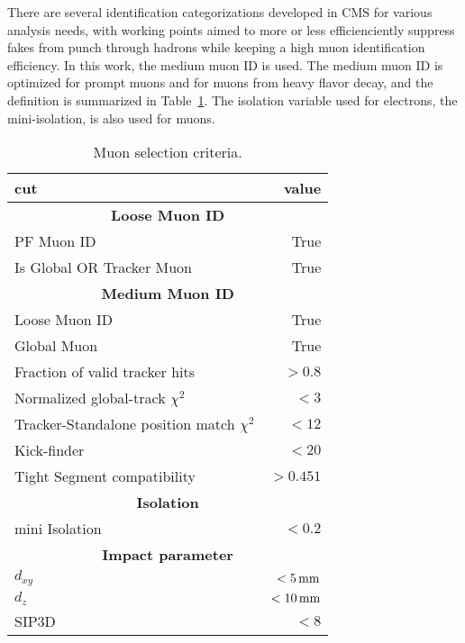There are several identification categorizations developed in CMS for various analysis needs, with working points aimed to more or less efficienciently suppress fakes from punch through hadrons while keeping a high muon identification efficiency.
In this work, the medium muon ID is used. The medium muon ID is optimized for prompt muons and for muons from heavy flavor decay, and the definition is summarized in Table~\ref{tab:muonsID}. 
The isolation variable used for electrons, the mini-isolation, is also used for muons. 

\begin{table}[ht!]
\def\arraystretch{1.2}
    \caption{Muon selection criteria.}
    \label{tab:muonsID}
    \begin{center}
        \begin{tabular}{ l r}
        \hline \hline
        cut         &  value                             \\ \hline
        \multicolumn{2}{c}{\textbf{Loose Muon ID}}                \\
             PF Muon ID                        &  True \\
             Is Global OR Tracker Muon                        &  True \\
        \multicolumn{2}{c}{\textbf{Medium Muon ID}}                \\
             Loose Muon ID                        &  True \\
             Global Muon                         &  True \\
             Fraction of valid tracker hits      &  $>0.8$ \\
             Normalized global-track $\chi^{2}$     &  $<3$ \\
             Tracker-Standalone position match $\chi^{2}$   &  $<12$ \\
             Kick-finder    &   $<20$\\
             Tight Segment compatibility  & $>0.451$\\
        \multicolumn{2}{c}{\textbf{Isolation}}                \\
             mini Isolation                 &   $<0.2$                         \\
        \multicolumn{2}{c}{\textbf{Impact parameter}}                \\
        $d_{xy}$ & $<5\,\text{mm}$ \\
        $d_{z} $ & $<10\,\text{mm}$ \\
        SIP3D    & $< 8$ \\
\hline\hline
\end{tabular}
\end{center}
\end{table}                                                                                                      

